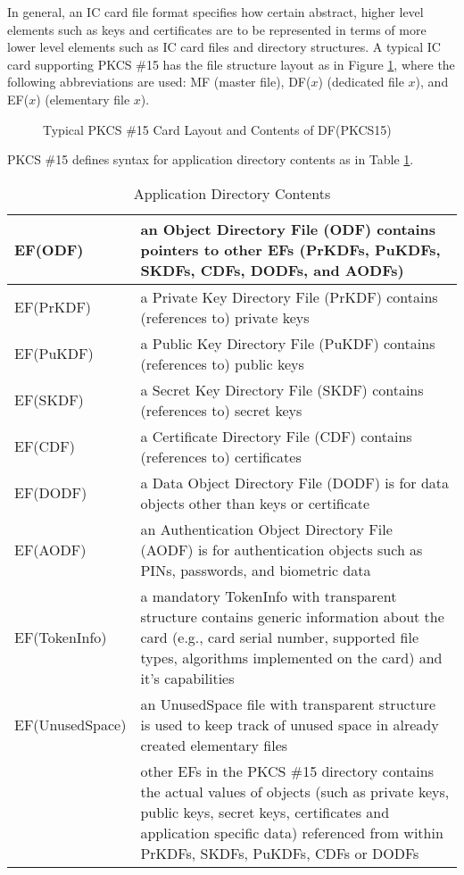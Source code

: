 \documentclass{article}
\begin{document}
In general, an IC card file format specifies how certain abstract, 
higher level elements such as keys and certificates are to be 
represented in terms of more lower level elements such as IC card files 
and directory structures. A typical IC card supporting 
PKCS \#15 has the file structure layout as in Figure \ref{pkcs15icf}, 
where the following abbreviations are used:
MF (master file), DF($x$) (dedicated file $x$), and 
EF($x$) (elementary file $x$).
\begin{center}
\begin{figure}[htb]
\caption{Typical PKCS \#15 Card Layout and Contents of DF(PKCS15)}
\label{pkcs15icf}
\end{figure}
\end{center}
PKCS \#15 defines syntax for application directory contents as in Table
\ref{icapp}.
\begin{table}[htb]
\caption{Application Directory Contents}
\label{icapp}
\begin{center}
\begin{tabular}{|l|p{12cm}|}\hline
EF(ODF) & an Object Directory File (ODF)
contains pointers to other EFs (PrKDFs, PuKDFs, 
SKDFs, CDFs, DODFs, and AODFs) \\ \hline
EF(PrKDF) &  a Private Key Directory File (PrKDF) contains 
(references to) private keys\\ \hline
EF(PuKDF) &  a Public Key Directory File (PuKDF) contains 
(references to) public keys\\ \hline
EF(SKDF)  &  a Secret Key Directory File (SKDF) contains 
(references to) secret keys\\ \hline
EF(CDF) & a Certificate Directory File (CDF)  contains 
(references to) certificates\\ \hline
EF(DODF) &  a Data Object Directory File (DODF) is for data objects
other than keys or certificate \\ \hline
EF(AODF) & an Authentication Object Directory File (AODF) is for 
authentication objects such as PINs, passwords, and biometric data \\ \hline
EF(TokenInfo) & a mandatory TokenInfo with transparent structure 
contains generic information about the card (e.g., card serial number,
supported file types, algorithms implemented on the card) and 
it's capabilities\\ \hline
EF(UnusedSpace) & an UnusedSpace file with transparent structure
is used to keep track of unused space in already created elementary files
\\ \hline
 &  other EFs in the PKCS \#15 directory contains the 
actual values of objects (such as private keys, public keys, 
secret keys, certificates and application specific data) referenced 
from within PrKDFs, SKDFs, PuKDFs, CDFs or DODFs  \\ \hline
\end{tabular}
\end{center}
\end{table}
\end{document}
